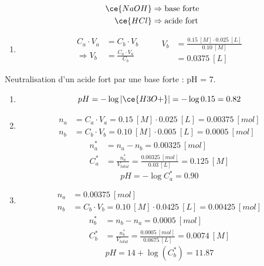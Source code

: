 \documentclass[
  11pt,
  french,
  a4paper,
  openany]{book}
\providecommand{\tightlist}{%
  \setlength{\itemsep}{0pt}\setlength{\parskip}{0pt}}
\begin{document}
\begin{Answer}

\[
\begin{split}
\ce{NaOH} &\Rightarrow \text{base forte} \\
\ce{HCl} &\Rightarrow \text{acide fort}
\end{split}
\]

\begin{enumerate}
\def\labelenumi{\alph{enumi}.}
\tightlist
\item
  \[
  \begin{split}
  C_a \cdot V_a &= C_b \cdot V_b \\
  \Rightarrow V_b &= \frac{C_a \cdot V_a}{C_b}
  \end{split}
  \qquad
  \begin{split}
  V_b &= \frac{0.15\ [M] \cdot 0.025\ [L]}{0.10\ [M]} \\
  &= 0.0375\ [L]
  \end{split}
  \]
\end{enumerate}

Neutralisation d'un acide fort par une base forte : pH = 7.

\begin{enumerate}
\def\labelenumi{\alph{enumi}.}
\setcounter{enumi}{1}
\item
  \[
  pH = - \log |\ce{H3O+}| = - \log 0.15 = 0.82
  \]
\item
  \[
  \begin{split}
  n_{a} &= C_{a} \cdot V_{a} = 0.15\ [M] \cdot 0.025\ [L] = 0.00375\ [mol] \\
  n_{b} &= C_{b} \cdot V_{b} = 0.10\ [M] \cdot 0.005\ [L] = 0.0005\ [mol]
  \end{split}
  \]
  \[
  \begin{split}
  n_{a}^* &= n_{a} - n_{b} = 0.00325\ [mol] \\
  C_{a}^* &= \frac{n_{a}^*}{V_{total}} = \frac{0.00325\ [mol]}{0.03\ [L]} = 0.125\ [M]
  \end{split}
  \]
  \[
  pH = - \log C_{a}^* = 0.90
  \]
\item
  \[
  \begin{split}
  n_{a} &= 0.00375\ [mol] \\
  n_{b} &= C_{b} \cdot V_{b} = 0.10\ [M] \cdot 0.0425\ [L] = 0.00425\ [mol]
  \end{split}
  \]
  \[
  \begin{split}
  n_{b}^* &= n_{b} - n_{a} = 0.0005\ [mol] \\
  C_{b}^* &= \frac{n_{b}^*}{V_{total}} = \frac{0.0005\ [mol]}{0.0675\ [L]} = 0.0074\ [M]
  \end{split}
  \]
  \[
  pH = 14 + \log(C_{b}^*) = 11.87
  \]
\end{enumerate}


\end{Answer}
\end{document}
